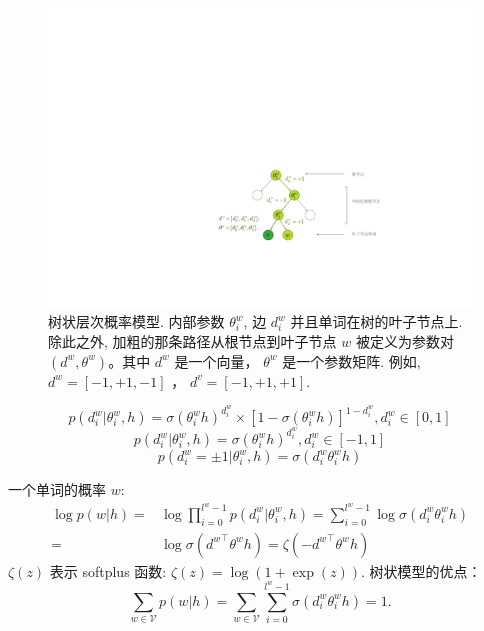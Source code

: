\documentclass[master,openright,twoside,color]{buaathesis}
\begin{document}
\begin{figure}
  \centering
    \includegraphics[width=0.75\linewidth]{./figures/thsm.pdf}
\caption{树状层次概率模型. 内部参数 $\theta_i^w$, 边 $d_i^w$ 并且单词在树的叶子节点上. 除此之外, 加粗的那条路径从根节点到叶子节点 $w$ 被定义为参数对 $(d^w,\theta^w)$。其中 $d^w$ 是一个向量， $\theta^w$ 是一个参数矩阵. 例如, $d^w=[-1,+1,-1]$ ， $d^{v}=[-1,+1,+1]$.}\label{fig:tree_hsm} %
\end{figure}

 \begin{equation}
p(d^w_i|\theta_{i}^w,h) =\sigma(\theta_{i}^w h)^{d_i^w}\times[1-\sigma(\theta_{i}^w h)]^{1-{d_i^w}},d_i^w \in [0,1]
\end{equation}
 \begin{equation}
p(d^w_i|\theta_{i}^w,h) =\sigma(\theta_{i}^w h)^{d_i^w}, d_i^w \in [-1,1]
\end{equation}
\begin{equation}
p(d^w_i=\pm 1|\theta_{i}^w,h) = \sigma({d_i^w}\theta_{i}^w h)
\end{equation}

一个单词的概率 $w$:
\begin{equation}\label{equ:pw}
\begin{split}
 \log p(w|h)=&\log\prod_{i=0}^{l^w-1} p(d^w_i|\theta_{i}^w,h) = \sum_{i=0}^{l^w -1} \log\sigma(d_i^w \theta_{i}^w h)\\
 =&\log\sigma({d^w}^\top \theta^w h)=\zeta(- {d^w}^\top \theta^w h )
 \end{split}
\end{equation}
$\zeta(z)$ 表示 softplus 函数: $\zeta(z)= \log (1+\exp(z))$.
树状模型的优点：
\begin{equation}
\sum_{w\in \mathcal{V}}{p(w|h)}=\sum_{w \in \mathcal{V}}\sum_{i=0}^{l^w-1}{\sigma(d_i^w\theta_{i}^w h)}=1.
\end{equation}
\end{document}
